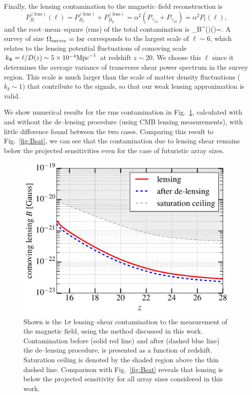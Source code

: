 Finally, the lensing contamination to the magnetic--field reconstruction is
\begin{equation}
P_B^{(\text{lens})}(\ell)=P^{(\text{lens})}_{B_x}+P^{(\text{lens})}_{B_y}=\alpha^2 (P_{\gamma_{13}}+P_{\gamma_{23}})=\alpha^2 P_t(\ell),
\end{equation}
and the root--mean--square (rms) of the total contamination is
\beq
\Delta_B^{()}(\ell)=.
\eeq
A survey of size $\Omega_{\rm survey}=1{\rm sr}$ corresponds to the largest scale of $\ell\sim 6$, which relates to the lensing potential fluctuations of comoving scale $k_\Phi=\ell/D(z)\sim 5\times 10^{-4}{\rm Mpc}^{-1}$ at redshift $z\sim 20$. We choose this $\ell$ since it determines the average variance of transverse shear power spectrum in the survey region. This scale is much larger than the scale of matter density fluctuations ($k_\delta\sim 1$) that contribute to the signals, so that our weak lensing approximation is valid.

We show numerical results for the rms contamination in Fig.~\ref{fig:lensing_B}, calculated with and without the de--lensing procedure (using CMB lensing measurements), with little difference found between the two cases. Comparing this result to Fig.~\ref{fig:Bsat}, we can see that the contamination due to lensing shear remains below the projected sensitivities even for the case of futuristic array sizes.
\begin{figure}[h]
\centering
\includegraphics[scale=0.4]{delensingB.pdf}
\caption{Shown is the $1\sigma$ lensing--shear contamination to the measurement of the magnetic field, using the method discussed in this work. Contamination before (solid red line) and after (dashed blue line) the de--lensing procedure, is presented as a function of redshift. Saturation ceiling is denoted by the shaded region above the thin dashed line. Comparison with Fig.~\ref{fig:Bsat} reveals that lensing is below the projected sensitivity for all array sizes considered in this work.}
\label{fig:lensing_B}
\end{figure}

